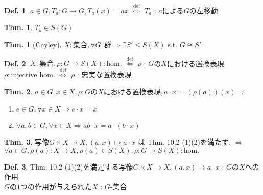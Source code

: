 \documentclass[uplatex,dvipdfmx,9pt]{beamer}
\newcommand{\defarrow}{\overset{\mathrm{def}}{\Leftrightarrow}}
\newcommand{\st}{\text{ s.t. }}
\newcounter{textThmCount}
\theoremstyle{definition} %
\newtheorem{defn}{Def.}[subsection] %
\newtheorem{thm}{Thm.}[subsection] %
\newtheorem{thmText}[textThmCount]{Thm.}
\theoremstyle{example}
\begin{document}
      \begin{frame}

        \begin{defn}
          $a \in G, T_a \colon G \to G, T_a(x) = ax$ $\defarrow$ $T_a$ : $a$による$G$の\alert{左移動}
        \end{defn}

        \begin{thm}
          $T_a \in S(G)$
        \end{thm}

        \begin{thmText}[Cayley]
          $X: \text{集合}, \forall G: \text{群} \Rightarrow \exists S' \le S(X) \st G \cong S'$
        \end{thmText}

        \begin{defn}
          $X: \text{集合}, \rho \colon G \to S(X): \text{hom.}$ $\defarrow$ $\rho$ : $G$の$X$における\alert{置換表現}\\
          $\rho : \text{injective hom.}$ $\defarrow$ $\rho$ : \alert{忠実な}置換表現
        \end{defn}
        
      \end{frame}

      \begin{frame}

        \begin{thm}
          $a \in G, x \in X, \rho: \text{$G$の$X$における置換表現}, a \cdot x \coloneqq (\rho(a))(x) \Rightarrow$
          \begin{enumerate}
            \item $e \in G, \forall x \in X \Rightarrow e \cdot x = x$
            \item $\forall a, b \in G, \forall x \in X \Rightarrow ab \cdot x = a \cdot (b \cdot x)$
          \end{enumerate}
        \end{thm}

        \begin{thm}
          $\text{写像} G \times X \to X, (a, x) \mapsto a \cdot x$ は Thm. 10.2 (1)(2)を満たす. $\Rightarrow$ \\
          $\forall a \in G, \rho(a) \colon X \to X, \rho(a) \in S(X), \rho \colon G \to S(X): \text{hom.}$
        \end{thm}

        \begin{defn}
          Thm. 10.2 (1)(2)を満足する写像$G \times X \to X, (a, x) \mapsto a \cdot x$ : $G$の$X$への\alert{作用} \\
          $G$の$1$つの作用が与えられた$X$ : \alert{$G$-集合}
        \end{defn}

      \end{frame}
\end{document}
